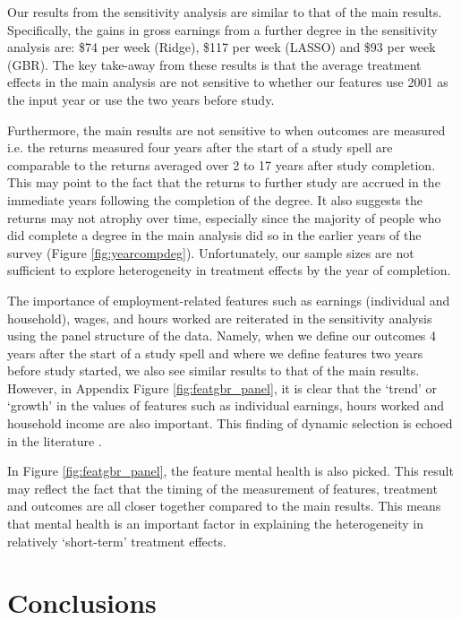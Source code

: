 \documentclass[12pt, a4paper]{article}
\begin{document}
Our results from the sensitivity analysis are similar to that of the main
results. Specifically, the gains in gross earnings from a further degree in the
sensitivity analysis are: \$74 per week (Ridge), \$117 per week (LASSO) and
\$93 per week (GBR). The key take-away from these results is that the average
treatment effects in the main analysis are not sensitive to whether our
features use 2001 as the input year or use the two years before study. 

Furthermore, the main results are not sensitive to when outcomes are measured
i.e. the returns measured four years after the start of a study spell are
comparable to the returns averaged over 2 to 17 years after study completion.
This may point to the fact that the returns to further study are accrued in the
immediate years following the completion of the degree. It also suggests the
returns may not atrophy over time, especially since the majority of people who
did complete a degree in the main analysis did so in the earlier years of the
survey (Figure \ref{fig:yearcompdeg}). Unfortunately, our sample sizes are not
sufficient to explore heterogeneity in treatment effects by the year of
completion. 

The importance of employment-related features such as earnings (individual and
household), wages, and hours worked are reiterated in the sensitivity analysis
using the panel structure of the data. Namely, when we define our outcomes 4
years after the start of a study spell and where we define features two years
before study started, we also see similar results to that of the main results.
However, in Appendix Figure \ref{fig:featgbr_panel}, it is clear that the `trend' or
`growth' in the values of features such as individual earnings, hours worked
and household income are also important. This finding of dynamic selection is
echoed in the literature \citep{jacobson2005, dynarski2016, dynarski2018}. 

In Figure \ref{fig:featgbr_panel}, the feature mental health is also picked.
This result may reflect the fact that the timing of the measurement of
features, treatment and outcomes are all closer together compared to the main
results. This means that mental health is an important factor in explaining the
heterogeneity in relatively `short-term' treatment effects. 


\section{Conclusions}
\end{document}
